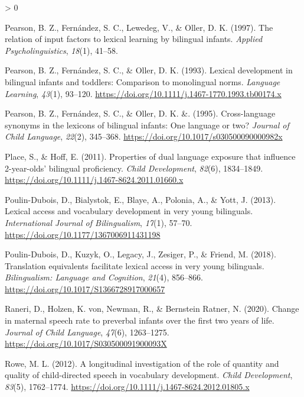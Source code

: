 \documentclass[
  english,
  ,man,floatsintext]{apa6}
\newlength{\cslhangindent}
\newenvironment{CSLReferences}[2] %
 {%
  \setlength{\parindent}{0pt}
  \ifodd #1 \everypar{\setlength{\hangindent}{\cslhangindent}}\ignorespaces\fi
  \ifnum #2 > 0
  \setlength{\parskip}{#2\baselineskip}
  \fi
 }%
 {}
\begin{document}
\begin{CSLReferences}{1}{0}
\leavevmode\hypertarget{ref-Pearson_etal_1997}{}%
Pearson, B. Z., Fernández, S. C., Lewedeg, V., \& Oller, D. K. (1997). The relation of input factors to lexical learning by bilingual infants. \emph{Applied Psycholinguistics}, \emph{18}(1), 41--58.

\leavevmode\hypertarget{ref-Pearson_etal_1993}{}%
Pearson, B. Z., Fernández, S. C., \& Oller, D. K. (1993). Lexical development in bilingual infants and toddlers: Comparison to monolingual norms. \emph{Language Learning}, \emph{43}(1), 93--120. \url{https://doi.org/10.1111/j.1467-1770.1993.tb00174.x}

\leavevmode\hypertarget{ref-Pearson_etal_1995}{}%
Pearson, B. Z., Fernández, S. C., \& Oller, D. K. \&. (1995). Cross-language synonyms in the lexicons of bilingual infants: One language or two? \emph{Journal of Child Language}, \emph{22}(2), 345--368. \url{https://doi.org/10.1017/s030500090000982x}

\leavevmode\hypertarget{ref-Place_Hoff_2011}{}%
Place, S., \& Hoff, E. (2011). Properties of dual language exposure that influence 2-year-olds' bilingual proficiency. \emph{Child Development}, \emph{82}(6), 1834--1849. \url{https://doi.org/10.1111/j.1467-8624.2011.01660.x}

\leavevmode\hypertarget{ref-Poulin-Dubois_etal_2013}{}%
Poulin-Dubois, D., Bialystok, E., Blaye, A., Polonia, A., \& Yott, J. (2013). Lexical access and vocabulary development in very young bilinguals. \emph{International Journal of Bilingualism}, \emph{17}(1), 57--70. \url{https://doi.org/10.1177/1367006911431198}

\leavevmode\hypertarget{ref-Poulin-Dubois_etal_2018}{}%
Poulin-Dubois, D., Kuzyk, O., Legacy, J., Zesiger, P., \& Friend, M. (2018). Translation equivalents facilitate lexical access in very young bilinguals. \emph{Bilingualism: Language and Cognition}, \emph{21}(4), 856--866. \url{https://doi.org/10.1017/S1366728917000657}

\leavevmode\hypertarget{ref-Raneri_etal_2020}{}%
Raneri, D., Holzen, K. von, Newman, R., \& Bernstein Ratner, N. (2020). Change in maternal speech rate to preverbal infants over the first two years of life. \emph{Journal of Child Language}, \emph{47}(6), 1263--1275. \url{https://doi.org/10.1017/S030500091900093X}

\leavevmode\hypertarget{ref-Rowe_2012}{}%
Rowe, M. L. (2012). A longitudinal investigation of the role of quantity and quality of child-directed speech in vocabulary development. \emph{Child Development}, \emph{83}(5), 1762--1774. \url{https://doi.org/10.1111/j.1467-8624.2012.01805.x}


\end{CSLReferences}
\end{document}
